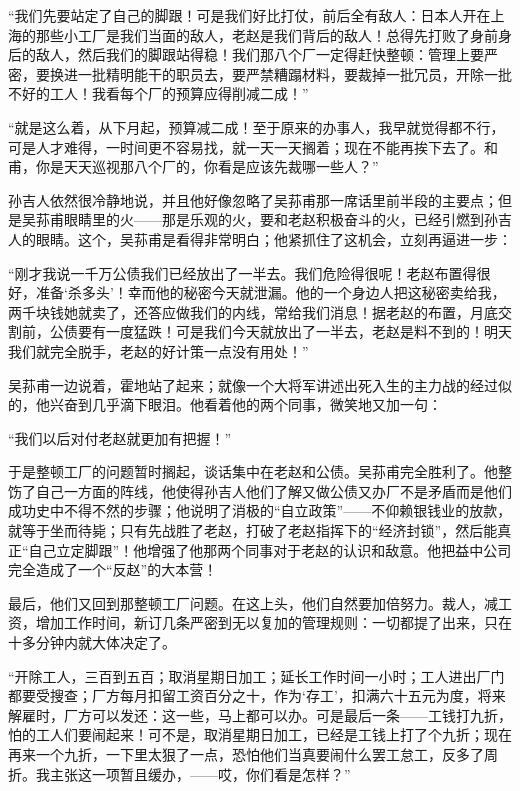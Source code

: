 \par “我们先要站定了自己的脚跟！可是我们好比打仗，前后全有敌人：日本人开在上海的那些小工厂是我们当面的敌人，老赵是我们背后的敌人！总得先打败了身前身后的敌人，然后我们的脚跟站得稳！我们那八个厂一定得赶快整顿：管理上要严密，要换进一批精明能干的职员去，要严禁糟蹋材料，要裁掉一批冗员，开除一批不好的工人！我看每个厂的预算应得削减二成！”
\par “就是这么着，从下月起，预算减二成！至于原来的办事人，我早就觉得都不行，可是人才难得，一时间更不容易找，就一天一天搁着；现在不能再挨下去了。和甫，你是天天巡视那八个厂的，你看是应该先裁哪一些人？”
\par 孙吉人依然很冷静地说，并且他好像忽略了吴荪甫那一席话里前半段的主要点；但是吴荪甫眼睛里的火——那是乐观的火，要和老赵积极奋斗的火，已经引燃到孙吉人的眼睛。这个，吴荪甫是看得非常明白；他紧抓住了这机会，立刻再逼进一步：
\par “刚才我说一千万公债我们已经放出了一半去。我们危险得很呢！老赵布置得很好，准备‘杀多头’！幸而他的秘密今天就泄漏。他的一个身边人把这秘密卖给我，两千块钱她就卖了，还答应做我们的内线，常给我们消息！据老赵的布置，月底交割前，公债要有一度猛跌！可是我们今天就放出了一半去，老赵是料不到的！明天我们就完全脱手，老赵的好计策一点没有用处！”
\par 吴荪甫一边说着，霍地站了起来；就像一个大将军讲述出死入生的主力战的经过似的，他兴奋到几乎滴下眼泪。他看着他的两个同事，微笑地又加一句：
\par “我们以后对付老赵就更加有把握！”
\par 于是整顿工厂的问题暂时搁起，谈话集中在老赵和公债。吴荪甫完全胜利了。他整饬了自己一方面的阵线，他使得孙吉人他们了解又做公债又办厂不是矛盾而是他们成功史中不得不然的步骤；他说明了消极的“自立政策”——不仰赖银钱业的放款，就等于坐而待毙；只有先战胜了老赵，打破了老赵指挥下的“经济封锁”，然后能真正“自己立定脚跟”！他增强了他那两个同事对于老赵的认识和敌意。他把益中公司完全造成了一个“反赵”的大本营！
\par 最后，他们又回到那整顿工厂问题。在这上头，他们自然要加倍努力。裁人，减工资，增加工作时间，新订几条严密到无以复加的管理规则：一切都提了出来，只在十多分钟内就大体决定了。
\par “开除工人，三百到五百；取消星期日加工；延长工作时间一小时；工人进出厂门都要受搜查；厂方每月扣留工资百分之十，作为‘存工’，扣满六十五元为度，将来解雇时，厂方可以发还：这一些，马上都可以办。可是最后一条——工钱打九折，怕的工人们要闹起来！可不是，取消星期日加工，已经是工钱上打了个九折；现在再来一个九折，一下里太狠了一点，恐怕他们当真要闹什么罢工怠工，反多了周折。我主张这一项暂且缓办，——哎，你们看是怎样？”

